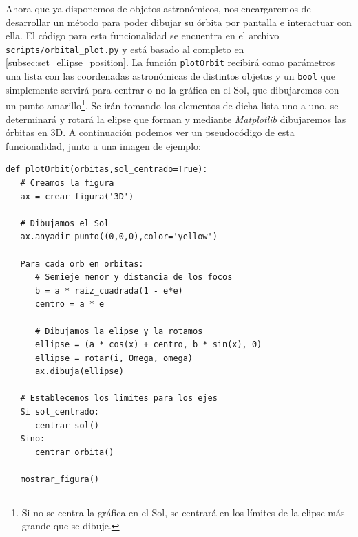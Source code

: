 Ahora que ya disponemos de objetos astronómicos, nos encargaremos de desarrollar un método para poder dibujar su órbita por pantalla e interactuar con ella. El código para esta funcionalidad se encuentra en el archivo \texttt{scripts/orbital\_plot.py} y está basado al completo en \ref{subsec:set_ellipse_position}. La función \texttt{plotOrbit} recibirá como parámetros una lista con las coordenadas astronómicas de distintos objetos y un \texttt{bool} que simplemente servirá para centrar o no la gráfica en el Sol, que dibujaremos con un punto amarillo\footnote{Si no se centra la gráfica en el Sol, se centrará en los límites de la elipse más grande que se dibuje.}. Se irán tomando los elementos de dicha lista uno a uno, se determinará y rotará la elipse que forman y mediante \textit{Matplotlib} dibujaremos las órbitas en 3D. A continuación podemos ver un pseudocódigo de esta funcionalidad, junto a una imagen de ejemplo:
\begin{lstlisting}[style=PythonCode]
def plotOrbit(orbitas,sol_centrado=True):
   # Creamos la figura
   ax = crear_figura('3D')
   
   # Dibujamos el Sol
   ax.anyadir_punto((0,0,0),color='yellow')
   
   Para cada orb en orbitas:
      # Semieje menor y distancia de los focos
      b = a * raiz_cuadrada(1 - e*e)
      centro = a * e
      
      # Dibujamos la elipse y la rotamos
      ellipse = (a * cos(x) + centro, b * sin(x), 0)
      ellipse = rotar(i, Omega, omega)
      ax.dibuja(ellipse)
   
   # Establecemos los limites para los ejes
   Si sol_centrado:
      centrar_sol()
   Sino:
      centrar_orbita()
      
   mostrar_figura()
\end{lstlisting}

